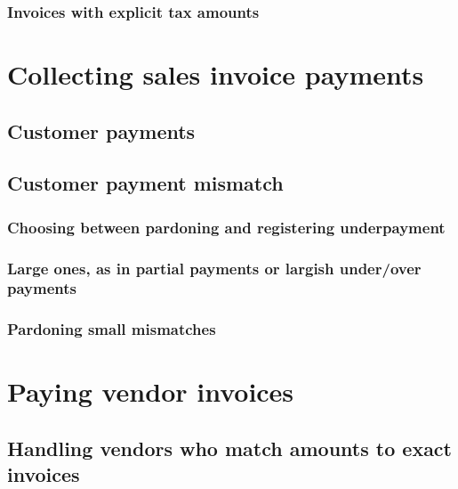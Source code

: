 \subsection{Invoices with explicit tax amounts}
\label{subsec-sales-tax-explicit-amount}



\chapter{Collecting sales invoice payments}
\label{cha-starting-sales-customer-payments}

\section{Customer payments}
\label{sec-starting-sales-customer-payments}

\section{Customer payment mismatch}
\label{sec-starting-sales-payment-mismatch}

\subsection{Choosing between pardoning and registering underpayment}
\label{subsec-sales-payment-mismatch}

\subsection{Large ones, as in partial payments or largish under/over payments}
\label{subsec-sales-payment-partial}

\subsection{Pardoning small mismatches}
\label{subsec-sales-payment-pardoning}



\chapter{Paying vendor invoices}
\label{cha-starting-vendor-payments}

\section{Handling vendors who match amounts to exact invoices}
\label{sec-vendor-invoice-exact-match}

